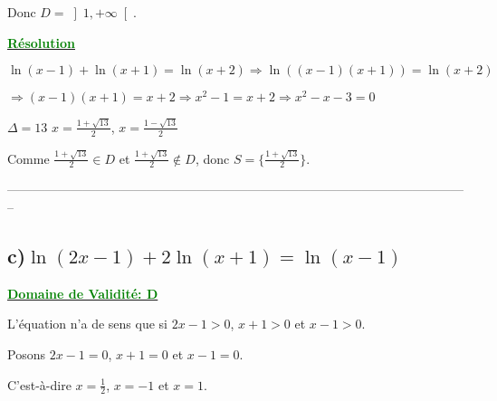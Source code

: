 \documentclass[12pt]{article}
\begin{document}
Donc $D=\left]1, +\infty\right[$.

\textbf{\underline{\textcolor{green}{Résolution}}}

$\ln(x-1) + \ln(x+1) = \ln(x+2) \Longrightarrow \ln((x-1)(x+1)) = \ln(x+2)$

$\Longrightarrow (x-1)(x+1) = x+2 \Longrightarrow x^2 - 1 = x+2 \Longrightarrow x^2 - x - 3 = 0$

$\Delta = 13$
$x=\frac{1+\sqrt{13}}{2}$, $x=\frac{1-\sqrt{13}}{2}$

Comme $\frac{1+\sqrt{13}}{2} \in D$ et $\frac{1+\sqrt{13}}{2} \notin D$, donc $S=\{\frac{1+\sqrt{13}}{2}\}$.

\textcolor{green}{}

--------------------------------------------------------------------------------------------------------------

\subsection*{c)$\ln(2x-1)+2\ln(x+1)=\ln(x-1)$}
\textbf{\underline{\textcolor{green}{Domaine de Validité: D}}}

L'équation n'a de sens que si $2x-1>0$, $x+1>0$ et $x-1>0$.

Posons $2x-1=0$, $x+1=0$ et $x-1=0$.

C'est-à-dire $x=\frac{1}{2}$, $x=-1$ et $x=1$.
\end{document}
